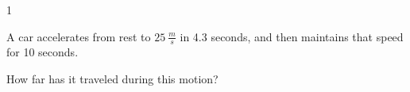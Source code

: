 
\AddToShipoutPicture*{\BackgroundPic}

\addtocounter {ProbNum} {1}

 
{\bf \Large{}} A car accelerates from rest to ${25~\tfrac{m}{s}}$ in 4.3 seconds, and then maintains that speed for 10 seconds.    \bigskip

How far has it traveled during this motion?  \vfill




\newpage